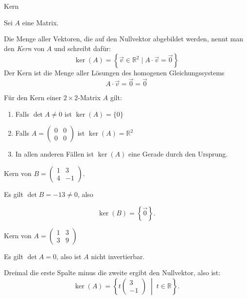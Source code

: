\clearpage
\begin{definition}
    {Kern}{}

Sei \( A \) eine Matrix.  

Die Menge aller Vektoren, die auf den Nullvektor abgebildet werden, nennt man den \emph{Kern} von \( A \) und schreibt dafür:
\[
\ker(A) = \left\{ \vec{v} \in \mathbb{R}^2 \mid A\cdot\vec{v} = \vec{0} \right\}
\]
Der Kern ist die Menge aller Lösungen des homogenen Gleichungssystems
\[
A\cdot\vec{v} = \vec{0} = \vec{0}
\]
\end{definition}
\begin{satz}
    {}{}
    Für den Kern einer $2\times 2$-Matrix $A$ gilt:
    \begin{enumerate}
        \item Falls $\det A \neq 0$ ist $\ker (A) = \{0\}$
        \item Falls $A = \begin{pmatrix}
            0 & 0 \\
            0 & 0 \end{pmatrix}$ ist $\ker (A) = \mathbb{R}^2$
        \item In allen anderen Fällen ist $\ker (A)$ eine Gerade durch den Ursprung.
    \end{enumerate}
\end{satz}

\begin{bsp}
{Kern von $B = \begin{pmatrix} 1 & 3 \\ 4 & -1 \end{pmatrix}.$}{}


Es gilt $\det B = -13 \neq 0$, also 

\[
\ker(B) = \left\{ \vec{0} \right\}.
\]

\end{bsp}


\begin{bsp}
    {Kern von $A = \begin{pmatrix} 1 & 3 \\ 3 & 9 \end{pmatrix}$ }{}


Es gilt $\det A = 0$, also ist $A$ nicht invertierbar.

Dreimal die erste Spalte minus die zweite ergibt den Nullvektor, also ist:
\[
\ker(A) = \left\{ t \begin{pmatrix} 3 \\ -1 \end{pmatrix} \;\middle|\; t \in \mathbb{R} \right\}.
\]

\end{bsp}


